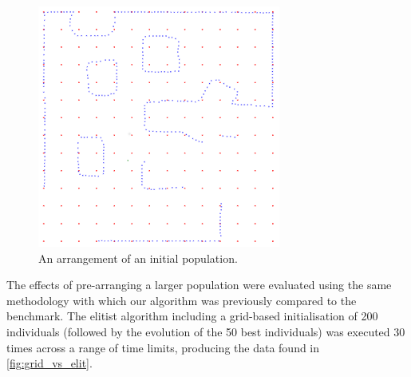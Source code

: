 \documentclass[authoryearcitations]{UoYCSproject}
\begin{document}
\begin{figure}[ht]
\centering
	\includegraphics[width=8cm,keepaspectratio]{images/grid.png}
	\caption{An arrangement of an initial population.}
	\label{fig:grid_init}
\end{figure}

The effects of pre-arranging a larger population were evaluated using the same methodology with which our algorithm was previously compared to the benchmark. The elitist algorithm including a grid-based initialisation of 200 individuals (followed by the evolution of the 50 best individuals) was executed 30 times across a range of time limits, producing the data found in \autoref{fig:grid_vs_elit}. 

\datatablegrid
\end{document}
